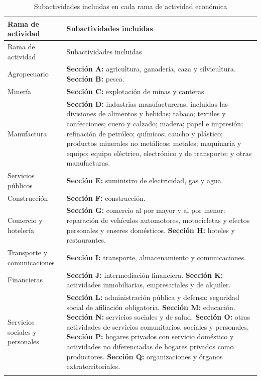 \small
\begin{longtable}{>{\raggedright\arraybackslash}p{4.0cm}p{10.5cm}}
\caption{Subactividades incluidas en cada rama de actividad económica}
\label{tab:subactividades}\\
\toprule
Rama de actividad & Subactividades incluidas \\
\midrule
\endfirsthead
\toprule
Rama de actividad & Subactividades incluidas \\
\midrule
\endhead
Agropecuario &
\textbf{Sección A:} agricultura, ganadería, caza y silvicultura.
\textbf{Sección B:} pesca. \\
\addlinespace
Minería &
\textbf{Sección C:} explotación de minas y canteras. \\
\addlinespace
Manufactura &
\textbf{Sección D:} industrias manufactureras, incluidas las divisiones de
alimentos y bebidas; tabaco; textiles y confecciones; cuero y calzado; madera;
papel e impresión; refinación de petróleo; químicos; caucho y plástico;
productos minerales no metálicos; metales; maquinaria y equipo; equipo
eléctrico, electrónico y de transporte; y otras manufacturas. \\
\addlinespace
Servicios públicos &
\textbf{Sección E:} suministro de electricidad, gas y agua. \\
\addlinespace
Construcción &
\textbf{Sección F:} construcción. \\
\addlinespace
Comercio y hotelería &
\textbf{Sección G:} comercio al por mayor y al por menor; reparación de
vehículos automotores, motocicletas y efectos personales y enseres domésticos.
\textbf{Sección H:} hoteles y restaurantes. \\
\addlinespace
Transporte y comunicaciones &
\textbf{Sección I:} transporte, almacenamiento y comunicaciones. \\
\addlinespace
Financieras &
\textbf{Sección J:} intermediación financiera.
\textbf{Sección K:} actividades inmobiliarias, empresariales y de alquiler. \\
\addlinespace
Servicios sociales y personales &
\textbf{Sección L:} administración pública y defensa; seguridad social de
afiliación obligatoria.
\textbf{Sección M:} educación.
\textbf{Sección N:} servicios sociales y de salud.
\textbf{Sección O:} otras actividades de servicios comunitarios, sociales y
personales.
\textbf{Sección P:} hogares privados con servicio doméstico y actividades no
diferenciadas de hogares privados como productores.
\textbf{Sección Q:} organizaciones y órganos extraterritoriales. \\
\bottomrule
\multicolumn{2}{l}{\footnotesize Fuente: DANE.}\\
\end{longtable}
\normalsize
